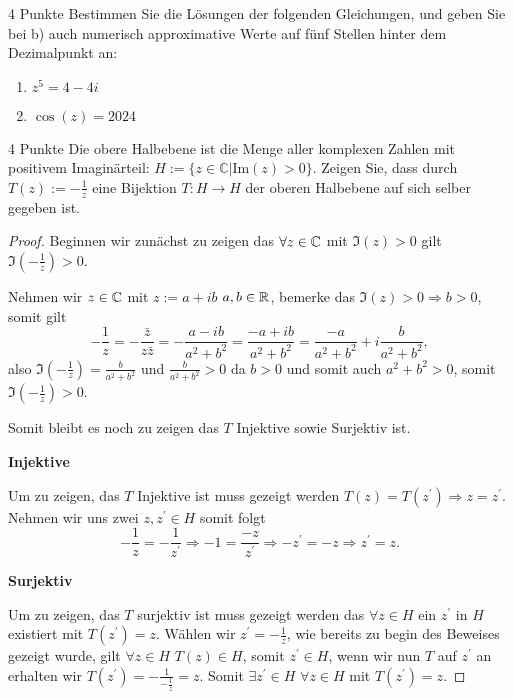 \documentclass{problemset}
\begin{document}
\begin{problem}{4 Punkte}
Bestimmen Sie die Lösungen der folgenden Gleichungen, und geben Sie bei b) auch numerisch approximative Werte auf fünf Stellen hinter dem Dezimalpunkt an:
\begin{enumerate}
    \item $z^5 = 4 - 4i$
    \item $\cos(z) = 2024$
\end{enumerate}
\end{problem}

\begin{problem}{4 Punkte}
Die obere Halbebene ist die Menge aller komplexen Zahlen mit positivem Imaginärteil: $H := \{z \in \mathbb{C} | \text{Im}(z) > 0\}$. Zeigen Sie, dass durch $T(z) := -\frac{1}{z}$ eine Bijektion $T : H \rightarrow H$ der oberen Halbebene auf sich selber gegeben ist.

\begin{proof}
    Beginnen wir zunächst zu zeigen das $\forall z \in \mathbb{C}$ mit $\Im(z) > 0$ gilt $\Im(-\frac{1}{z}) > 0$.

    Nehmen wir $z \in \mathbb{C}$ mit $z := a + ib$ $a,b \in \mathbb{R}$, bemerke das
    $\Im(z) > 0 \Rightarrow b > 0$, somit gilt
    \[
        - \frac{1}{z} = - \frac{\bar{z}}{z\bar{z}} = - \frac{a - ib}{a^2 + b^2} = \frac{-a + ib}{a^2 + b^2} = \frac{-a}{a^2+b^2} + i\frac{b}{a^2+b^2},
    \] also $\Im(-\frac{1}{z}) = \frac{b}{a^2 + b^2}$ und $\frac{b}{a^2 + b^2} > 0$ da
    $b > 0$ und somit auch $a^2 + b^2 > 0$, somit $\Im(-\frac{1}{z}) > 0$.

    Somit bleibt es noch zu zeigen das $T$ Injektive sowie Surjektiv ist.

    \textbf{Injektive}

    Um zu zeigen, das $T$ Injektive ist muss gezeigt werden $T(z) = T(z^\prime)
        \Rightarrow z = z^\prime$. Nehmen wir uns zwei $z, z^\prime \in H$ somit folgt
    \[
        - \frac{1}{z} = - \frac{1}{z^\prime} \Rightarrow -1 = \frac{-z}{z^\prime} \Rightarrow -z^\prime = -z \Rightarrow z^\prime = z.
    \]

    \textbf{Surjektiv}

    Um zu zeigen, das $T$ surjektiv ist muss gezeigt werden das $\forall z \in H$
    ein $z^\prime$ in $H$ existiert mit $T(z^\prime) = z$. Wählen wir $z^\prime = -
        \frac{1}{z}$, wie bereits zu begin des Beweises gezeigt wurde, gilt $\forall z
        \in H$ $T(z) \in H$, somit $z^\prime \in H$, wenn wir nun $T$ auf $z^\prime$ an
    erhalten wir $T(z^\prime) = -\frac{1}{-\frac{1}{z}} = z$. Somit $\exists
        z^\prime \in H$ $\forall z \in H$ mit $T(z^\prime) = z$.

\end{proof}
\end{problem}
\end{document}
